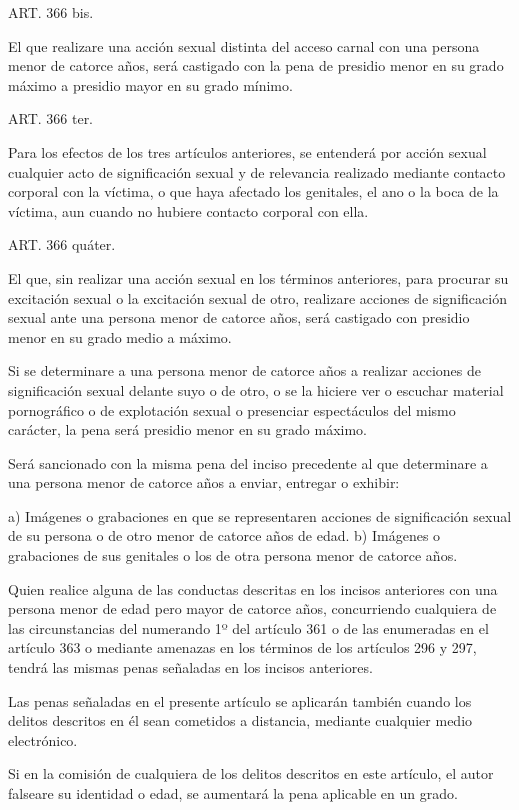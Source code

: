     ART. 366 bis.

    El que realizare una acción sexual distinta del acceso carnal con una persona menor de catorce años, será castigado con la pena de presidio menor en su grado máximo a presidio mayor en su grado mínimo.

    ART. 366 ter.


    Para los efectos de los tres artículos anteriores, se entenderá por acción sexual cualquier acto de significación sexual y de relevancia realizado mediante contacto corporal con la víctima, o que haya afectado los genitales, el ano o la boca de la víctima, aun cuando no hubiere contacto corporal con ella.

    ART. 366 quáter.

    El que, sin realizar una acción sexual en los términos anteriores, para procurar su excitación sexual o la excitación sexual de otro, realizare acciones de significación sexual ante una persona menor de catorce años, será castigado con presidio menor en su grado medio a máximo.

    Si se determinare a una persona menor de catorce años a realizar acciones de significación sexual delante suyo o de otro, o se la hiciere ver o escuchar material pornográfico o de explotación sexual o presenciar espectáculos del mismo carácter, la pena será presidio menor en su grado máximo.

    Será sancionado con la misma pena del inciso precedente al que determinare a una persona menor de catorce años a enviar, entregar o exhibir:
     
    a) Imágenes o grabaciones en que se representaren acciones de significación sexual de su persona o de otro menor de catorce años de edad.
    b) Imágenes o grabaciones de sus genitales o los de otra persona menor de catorce años.

    Quien realice alguna de las conductas descritas en los incisos anteriores con una persona menor de edad pero mayor de catorce años, concurriendo cualquiera de las circunstancias del numerando 1º del artículo 361 o de las enumeradas en el artículo 363 o mediante amenazas en los términos de los artículos 296 y 297, tendrá las mismas penas señaladas en los incisos anteriores.

    Las penas señaladas en el presente artículo se aplicarán también cuando los delitos descritos en él sean cometidos a distancia, mediante cualquier medio electrónico.

    Si en la comisión de cualquiera de los delitos descritos en este artículo, el autor falseare su identidad o edad, se aumentará la pena aplicable en un grado.



